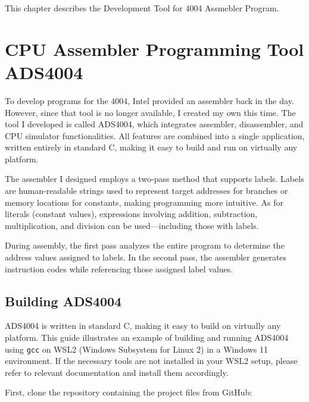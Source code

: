This chapter describes the Development Tool for 4004 Assmebler Program.%
\section{CPU Assembler Programming Tool ADS4004}
To develop programs for the 4004, Intel provided an assembler back in the day\cite{MCS4SoftwareManual}. However, since that tool is no longer available, I created my own this time. The tool I developed is called ADS4004, which integrates assembler, disassembler, and CPU simulator functionalities. All features are combined into a single application, written entirely in standard C, making it easy to build and run on virtually any platform.

The assembler I designed employs a two-pass method that supports labels. Labels are human-readable strings used to represent target addresses for branches or memory locations for constants, making programming more intuitive. As for literals (constant values), expressions involving addition, subtraction, multiplication, and division can be used—including those with labels.

During assembly, the first pass analyzes the entire program to determine the address values assigned to labels. In the second pass, the assembler generates instruction codes while referencing those assigned label values.

\subsection{Building ADS4004}
ADS4004 is written in standard C, making it easy to build on virtually any platform.  
This guide illustrates an example of building and running ADS4004 using \texttt{gcc} on WSL2 (Windows Subsystem for Linux 2) in a Windows 11 environment.  
If the necessary tools are not installed in your WSL2 setup, please refer to relevant documentation and install them accordingly.

First, clone the repository containing the project files from GitHub:\\

\begin{scriptsize}
\end{scriptsize}
\\

